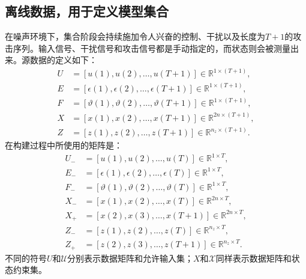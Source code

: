 \documentclass{article}
\begin{document}
\subsection*{离线数据，用于定义模型集合}
在噪声环境下，集合阶段会持续施加令人兴奋的控制、干扰以及长度为$T+1$的攻击序列。输入信号、干扰信号和攻击信号都是手动指定的，而状态则会被测量出来。源数据的定义如下：
\begin{align}
U&=[u(1),u(2),\ldots,u(T+1)]\in\mathbb{R}^{1\times(T+1)}, \tag{23a}\\
E&=[\epsilon(1),\epsilon(2),\ldots,\epsilon(T+1)]\in\mathbb{R}^{1\times(T+1)}, \tag{23b}\\
F&=[\vartheta(1),\vartheta(2),\ldots,\vartheta(T+1)]\in\mathbb{R}^{1\times(T+1)}, \tag{23c}\\
X&=[x(1),x(2),\ldots,x(T+1)]\in\mathbb{R}^{2n\times(T+1)}, \tag{23d}\\
Z&=[z(1),z(2),\ldots,z(T+1)]\in\mathbb{R}^{n_z\times(T+1)}. \tag{24}
\end{align}
在构建过程中所使用的矩阵是：
\begin{align}
U_-&=[u(1),u(2),\ldots,u(T)]\in\mathbb{R}^{1\times T}, \tag{25a}\\
E_-&=[\epsilon(1),\epsilon(2),\ldots,\epsilon(T)]\in\mathbb{R}^{1\times T}, \tag{25b}\\
F_-&=[\vartheta(1),\vartheta(2),\ldots,\vartheta(T)]\in\mathbb{R}^{1\times T}, \tag{25c}\\
X_-&=[x(1),x(2),\ldots,x(T)]\in\mathbb{R}^{2n\times T}, \tag{25d}\\
X_+&=[x(2),x(3),\ldots,x(T+1)]\in\mathbb{R}^{2n\times T}, \tag{25e}\\
Z_-&=[z(1),z(2),\ldots,z(T)]\in\mathbb{R}^{n_z\times T}, \tag{25f}\\
Z_+&=[z(2),z(3),\ldots,z(T+1)]\in\mathbb{R}^{n_z\times T}. \tag{25g}
\end{align}
不同的符号$U$和$\mathcal{U}$分别表示数据矩阵和允许输入集；$X$和$\mathcal{X}$同样表示数据矩阵和状态约束集。
\end{document}
